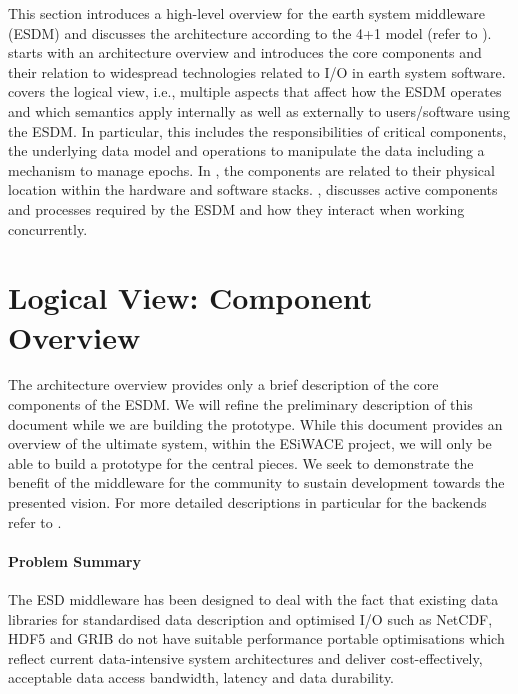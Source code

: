 \begin{chapterIntro}
This section introduces a high-level overview for the earth system middleware (ESDM) and discusses the architecture according to the 4+1 model (refer to ).
 starts with an architecture overview and introduces the core components and their relation to widespread technologies related to I/O in earth system software.
 covers the logical view, i.e., multiple aspects that affect how the ESDM operates and which semantics apply internally as well as externally to users/software using the ESDM.
In particular, this includes the responsibilities of critical components, the underlying data model and operations to manipulate the data including a mechanism to manage epochs.
In , the components are related to their physical location within the hardware and software stacks.
, discusses active components and processes required by the ESDM and how they interact when working concurrently.
\end{chapterIntro}


\section{Logical View: Component Overview}
\label{sec: viewpoints/logical}


The architecture overview provides only a brief description of the core components of the ESDM.
We will refine the preliminary description of this document while we are building the prototype.
While this document provides an overview of the ultimate system, within the ESiWACE project, we will only be able to build a prototype for the central pieces.
We seek to demonstrate the benefit of the middleware for the community to sustain development towards the presented vision.
For more detailed descriptions in particular for the backends refer to .


\paragraph {Problem Summary}
The ESD middleware has been designed to deal with the fact that existing  data
libraries for standardised data description and optimised I/O such as NetCDF,
HDF5 and GRIB do not have suitable performance portable optimisations which
reflect current data-intensive system architectures and deliver cost-effectively,
acceptable data access bandwidth, latency and data durability.

